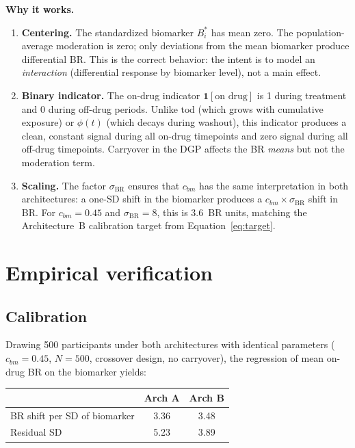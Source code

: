 \documentclass[11pt]{article}
\begin{document}
\textbf{Why it works.}

\begin{enumerate}[leftmargin=2em]

\item \textbf{Centering.} The standardized biomarker
  $B_i^{*}$ has mean zero. The population-average moderation
  is zero; only deviations from the mean biomarker produce
  differential BR. This is the correct behavior: the intent is to model
  an \emph{interaction} (differential response by
  biomarker level), not a main effect.

\item \textbf{Binary indicator.} The on-drug indicator
  $\mathbf{1}[\text{on drug}]$ is 1 during treatment and 0
  during off-drug periods. Unlike $\text{tod}$ (which grows
  with cumulative exposure) or $\phi(t)$ (which decays during
  washout), this indicator produces a clean, constant signal
  during all on-drug timepoints and zero signal during all
  off-drug timepoints. Carryover in the DGP affects the BR
  \emph{means} but not the moderation term.

\item \textbf{Scaling.} The factor $\sigma_{\text{BR}}$
  ensures that $c_{bm}$ has the same interpretation in both
  architectures: a one-SD shift in the biomarker produces a
  $c_{bm} \times \sigma_{\text{BR}}$ shift in BR. For
  $c_{bm} = 0.45$ and $\sigma_{\text{BR}} = 8$, this is
  3.6~BR units, matching the Architecture~B calibration
  target from Equation~\ref{eq:target}.

\end{enumerate}

\section{Empirical verification}

\subsection{Calibration}

Drawing 500 participants under both architectures with
identical parameters ($c_{bm} = 0.45$, $N = 500$, crossover
design, no carryover), the regression of mean on-drug BR on
the biomarker yields:

\begin{center}
\begin{tabular}{lcc}
\toprule
& \textbf{Arch A} & \textbf{Arch B} \\
\midrule
BR shift per SD of biomarker & 3.36 & 3.48 \\
Residual SD & 5.23 & 3.89 \\
\bottomrule
\end{tabular}
\end{center}
\end{document}
